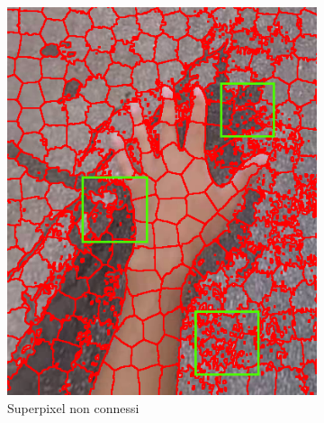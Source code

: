 \documentclass[12pt,a4paper,oneside]{article}
\begin{document}
\begin{figure}[!htb]	
	\centering
	\begin{subfigure}[t]{.495\textwidth}
		\includegraphics[width=\textwidth]{resources/images/connectivity_no.png}
		\caption{Superpixel non connessi}
	\end{subfigure}%
	\hfill
	\begin{subfigure}[t]{.495\textwidth}

\end{subfigure}
\end{figure}
\end{document}
